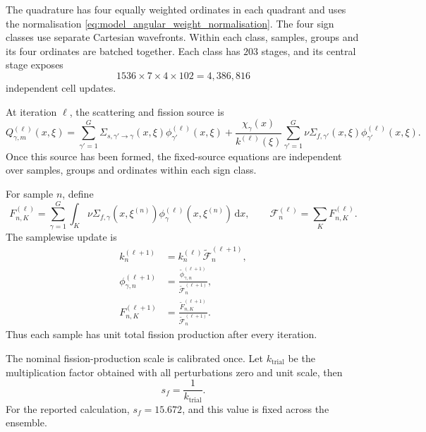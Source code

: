 \documentclass[final]{amsart}
\begin{document}
The quadrature has four equally weighted ordinates in each quadrant
and uses the normalisation
\eqref{eq:model_angular_weight_normalisation}. The four sign classes
use separate Cartesian wavefronts. Within each class, samples, groups
and its four ordinates are batched together. Each class has $203$
stages, and its central stage exposes
\[
1536\times7\times4\times102
=
4{,}386{,}816
\]
independent cell updates.

At iteration $\ell$, the scattering and fission source is
\begin{equation}
Q_{\gamma,m}^{(\ell)}(x,\xi)
=
\sum_{\gamma'=1}^{G}
\Sigma_{s,\gamma'\to\gamma}(x,\xi)
\phi_{\gamma'}^{(\ell)}(x,\xi)
+
\frac{\chi_\gamma(x)}{k^{(\ell)}(\xi)}
\sum_{\gamma'=1}^{G}
\nu\Sigma_{f,\gamma'}(x,\xi)
\phi_{\gamma'}^{(\ell)}(x,\xi).
\label{eq:pincell_power_source}
\end{equation}
Once this source has been formed, the fixed-source equations are
independent over samples, groups and ordinates within each sign class.

For sample $n$, define
\begin{equation}
F_{n,K}^{(\ell)}
=
\sum_{\gamma=1}^{G}
\int_K
\nu\Sigma_{f,\gamma}(x,\xi^{(n)})
\phi_\gamma^{(\ell)}(x,\xi^{(n)})\,\mathrm dx,
\qquad
\mathscr F_n^{(\ell)}
=
\sum_K F_{n,K}^{(\ell)}.
\label{eq:pincell_cellwise_fission}
\end{equation}
The samplewise update is
\begin{align}
k_n^{(\ell+1)}
&=
k_n^{(\ell)}
\widetilde{\mathscr F}_n^{(\ell+1)},
\label{eq:pincell_keff_update}
\\
\phi_{\gamma,n}^{(\ell+1)}
&=
\frac{\widetilde\phi_{\gamma,n}^{(\ell+1)}}
{\widetilde{\mathscr F}_n^{(\ell+1)}},
\label{eq:pincell_flux_normalisation}
\\
F_{n,K}^{(\ell+1)}
&=
\frac{\widetilde F_{n,K}^{(\ell+1)}}
{\widetilde{\mathscr F}_n^{(\ell+1)}}.
\label{eq:pincell_fission_normalisation}
\end{align}
Thus each sample has unit total fission production after every
iteration.

The nominal fission-production scale is calibrated once. Let
$k_{\mathrm{trial}}$ be the multiplication factor obtained with all
perturbations zero and unit scale, then
\begin{equation}
s_f=\frac{1}{k_{\mathrm{trial}}}.
\label{eq:pincell_fission_calibration}
\end{equation}
For the reported calculation, $s_f=15.672$, and this value is fixed
across the ensemble.
\end{document}

